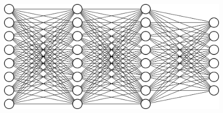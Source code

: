 \documentclass[xcolor=pdftex,dvipsnames,table,mathserif]{beamer}
\begin{document}
{\begin{columns}
  \begin{column}{.5\textwidth}
  \begin{figure}
    \includegraphics[width=\textwidth]{mini_reseau3_bis}
  \end{figure}

  \end{column}
\end{columns}


}








\end{document}
